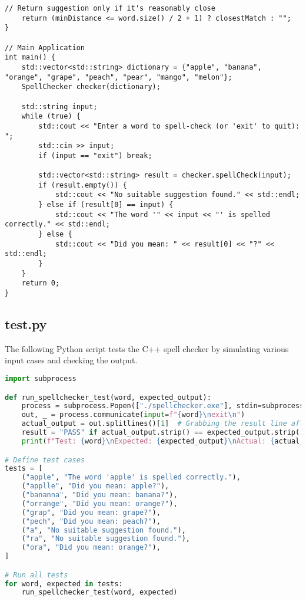 \documentclass{article}
\begin{document}
\begin{lstlisting}[caption={main.cpp}, label={lst:main}]
    // Return suggestion only if it's reasonably close
    return (minDistance <= word.size() / 2 + 1) ? closestMatch : "";
}

// Main Application
int main() {
    std::vector<std::string> dictionary = {"apple", "banana", "orange", "grape", "peach", "pear", "mango", "melon"};
    SpellChecker checker(dictionary);

    std::string input;
    while (true) {
        std::cout << "Enter a word to spell-check (or 'exit' to quit): ";
        std::cin >> input;
        if (input == "exit") break;

        std::vector<std::string> result = checker.spellCheck(input);
        if (result.empty()) {
            std::cout << "No suitable suggestion found." << std::endl;
        } else if (result[0] == input) {
            std::cout << "The word '" << input << "' is spelled correctly." << std::endl;
        } else {
            std::cout << "Did you mean: " << result[0] << "?" << std::endl;
        }
    }
    return 0;
}
\end{lstlisting}

\subsection*{test.py}
The following Python script tests the C++ spell checker by simulating various input cases and checking the output.

\begin{lstlisting}[language=Python, caption={test.py}, label={lst:test}]
import subprocess

def run_spellchecker_test(word, expected_output):
    process = subprocess.Popen(["./spellchecker.exe"], stdin=subprocess.PIPE, stdout=subprocess.PIPE, text=True)
    out, _ = process.communicate(input=f"{word}\nexit\n")
    actual_output = out.splitlines()[1]  # Grabbing the result line after input prompt
    result = "PASS" if actual_output.strip() == expected_output.strip() else "FAIL"
    print(f"Test: {word}\nExpected: {expected_output}\nActual: {actual_output}\nResult: {result}\n")

# Define test cases
tests = [
    ("apple", "The word 'apple' is spelled correctly."),
    ("applle", "Did you mean: apple?"),
    ("bananna", "Did you mean: banana?"),
    ("orrange", "Did you mean: orange?"),
    ("grap", "Did you mean: grape?"),
    ("pech", "Did you mean: peach?"),
    ("a", "No suitable suggestion found."),
    ("ra", "No suitable suggestion found."),
    ("ora", "Did you mean: orange?"),
]

# Run all tests
for word, expected in tests:
    run_spellchecker_test(word, expected)
\end{lstlisting}
\end{document}
